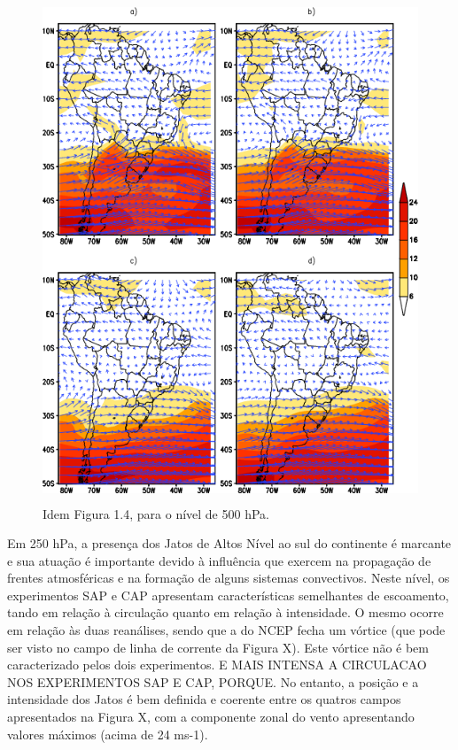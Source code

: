 \begin{figure}[!hbp]
\centering
\includegraphics[height=15cm]{./figs/media_ventos_anl_500hPa.png}
\caption{Idem Figura 1.4, para o nível de 500 hPa.}
\label{fig35}
\end{figure}

Em 250 hPa, a presença dos Jatos de Altos Nível ao sul do continente é marcante e sua atuação é importante devido à influência que exercem na propagação de frentes atmosféricas e na formação de alguns sistemas convectivos. Neste nível, os experimentos SAP e CAP apresentam características semelhantes de escoamento, tando em relação à circulação quanto em relação à intensidade. O mesmo ocorre em relação às duas reanálises, sendo que a do NCEP fecha um vórtice (que pode ser visto no campo de linha de corrente da Figura X). Este vórtice não é bem caracterizado pelos dois experimentos. E MAIS INTENSA A CIRCULACAO NOS EXPERIMENTOS SAP E CAP, PORQUE. No entanto, a posição e a intensidade dos Jatos é bem definida e coerente entre os quatros campos apresentados na Figura X, com a componente zonal do vento apresentando valores máximos (acima de 24 ms-1).

